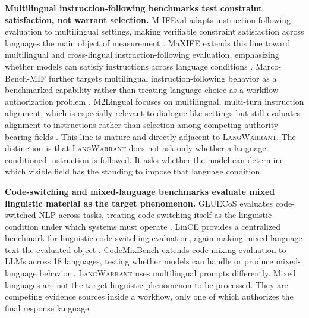\documentclass[10pt,conference]{IEEEtran}
\newcommand{\dataset}{\textsc{LangWarrant}}
\begin{document}
\textbf{Multilingual instruction-following benchmarks test constraint satisfaction, not warrant selection.}
M-IFEval adapts instruction-following evaluation to multilingual settings, making verifiable constraint satisfaction across languages the main object of measurement \cite{dussolle2025mifeval}. MaXIFE extends this line toward multilingual and cross-lingual instruction-following evaluation, emphasizing whether models can satisfy instructions across language conditions \cite{liu2025maxife}. Marco-Bench-MIF further targets multilingual instruction-following behavior as a benchmarked capability rather than treating language choice as a workflow authorization problem \cite{zeng2025marco}. M2Lingual focuses on multilingual, multi-turn instruction alignment, which is especially relevant to dialogue-like settings but still evaluates alignment to instructions rather than selection among competing authority-bearing fields \cite{maheshwary2025m2lingual}. This line is mature and directly adjacent to \dataset{}. The distinction is that \dataset{} does not ask only whether a language-conditioned instruction is followed. It asks whether the model can determine which visible field has the standing to impose that language condition.

\textbf{Code-switching and mixed-language benchmarks evaluate mixed linguistic material as the target phenomenon.}
GLUECoS evaluates code-switched NLP across tasks, treating code-switching itself as the linguistic condition under which systems must operate \cite{khanuja2020gluecos}. LinCE provides a centralized benchmark for linguistic code-switching evaluation, again making mixed-language text the evaluated object \cite{aguilar2020lince}. CodeMixBench extends code-mixing evaluation to LLMs across 18 languages, testing whether models can handle or produce mixed-language behavior \cite{yang2025codemixbench}. \dataset{} uses multilingual prompts differently. Mixed languages are not the target linguistic phenomenon to be processed. They are competing evidence sources inside a workflow, only one of which authorizes the final response language.
\end{document}
